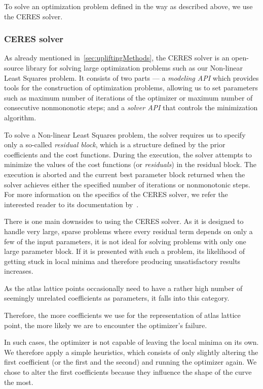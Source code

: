 To solve an optimization problem defined in the way as described above, we use the CERES solver.

\subsubsection{CERES solver} \label{sssec:ceresSolver}

As already mentioned in~\cref{sec:upliftingMethods}, the CERES solver is an open-source library for solving large optimization problems such as our Non-linear Least Squares problem. It consists of two parts --- a \emph{modeling API} which provides tools for the construction of optimization problems, allowing us to set parameters such as maximum number of iterations of the optimizer or maximum number of consecutive nonmononotic steps; and a \emph{solver API} that controls the minimization algorithm.

To solve a Non-linear Least Squares problem, the solver requires us to specify only a so-called \emph{residual block}, which is a structure defined by the prior coefficients and the cost functions. During the execution, the solver attempts to minimize the values of the cost functions (or \emph{residuals}) in the residual block. The execution is aborted and the current best parameter block returned when the solver achieves either the specified number of iterations or nonmonotonic steps. For more information on the specifics of the CERES solver, we refer the interested reader to its documentation by~\citet{ceresNonLinearLeastSquares}.

There is one main downsides to using the CERES solver. As it is designed to handle very large, sparse problems where every residual term depends on only a few of the input parameters, it is not ideal for solving problems with only one large parameter block. If it is presented with such a problem, its likelihood of getting stuck in local minima and therefore producing unsatisfactory results increases. 

As the atlas lattice points occasionally need to have a rather high number of seemingly unrelated coefficients as parameters, it falls into this category.

Therefore, the more coefficients we use for the representation of atlas lattice point, the more likely we are to encounter the optimizer's failure.


In such cases, the optimizer is not capable of leaving the local minima on its own. We therefore apply a simple heuristics, which consists of only slightly altering the first coefficient (or the first and the second) and running the optimizer again. We chose to alter the first coefficients because they influence the shape of the curve the most.

